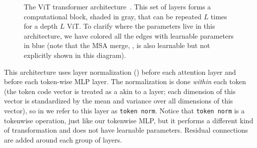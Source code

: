 \begin{figure}[h]
{\begin{minipage}{.49\linewidth}
\end{minipage}
}
\caption{The ViT transformer architecture~\cite{dosovitskiy2020vit}. This set of layers forms a computational block, shaded in gray, that can be repeated $L$ times for a depth $L$ ViT. To clarify where the parameters live in this architecture, we have colored all the edges with learnable parameters in blue (note that the MSA merge, \eqn{\ref{eqn:transformers:MSA_merge}}, is also learnable but not explicitly shown in this diagram).}
\label{fig:transformers:ViT_arch}
\end{figure}

This architecture uses layer normalization (\sect{\ref{sec:neural_nets:normalization_layers}}) before each attention layer and before each token-wise MLP layer. The normalization is done \textit{within} each token (the token code vector is treated as a akin to a layer; each dimension of this vector is standardized by the mean and variance over all dimensions of this vector), so in \fig{\ref{sec:neural_nets:normalization_layers}} we refer to this layer as \texttt{token norm}. Notice that \texttt{token norm} is a tokenwise operation, just like our tokenwise MLP, but it performs a different kind of transformation and does not have learnable parameters. Residual connections are added around each group of layers.


